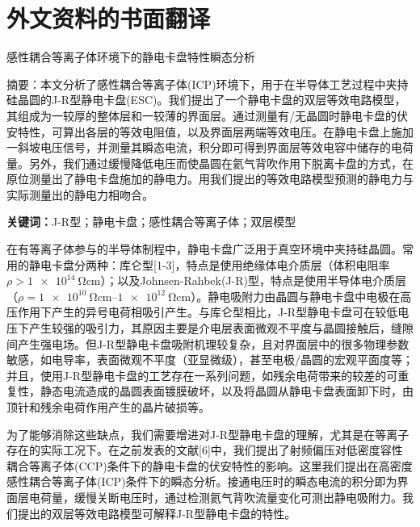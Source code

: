 \cleardoublepage

\newcommand{\apptitle}[1]{\parbox{0.9\linewidth}{\centering #1}\par\bigskip}
\newcommand{\appfigref}[2]{图~#1 -- #2~}
\newcommand{\appcite}[1]{\par\bigskip\apptitle{原文索引}\noindent\parbox{1\linewidth}{\small #1}}
\chapter{外文资料的书面翻译}

\apptitle{感性耦合等离子体环境下的静电卡盘特性瞬态分析}

\noindent 摘要：本文分析了感性耦合等离子体(ICP)环境下，用于在半导体工艺过程中夹持硅晶圆的J-R型静电卡盘(ESC)。我们提出了一个静电卡盘的双层等效电路模型，其组成为一较厚的整体层和一较薄的界面层。通过测量有/无晶圆时静电卡盘的伏安特性，可算出各层的等效电阻值，以及界面层两端等效电压。在静电卡盘上施加一斜坡电压信号，并测量其瞬态电流，积分即可得到界面层等效电容中储存的电荷量。另外，我们通过缓慢降低电压而使晶圆在氦气背吹作用下脱离卡盘的方式，在原位测量出了静电卡盘施加的静电力。用我们提出的等效电路模型预测的静电力与实际测量出的静电力相吻合。

\par\bigskip

\noindent \textbf{关键词：}J-R型；静电卡盘；感性耦合等离子体；双层模型

\par\bigskip

在有等离子体参与的半导体制程中，静电卡盘广泛用于真空环境中夹持硅晶圆。常用的静电卡盘分两种：库仑型[1-3]，特点是使用绝缘体电介质层（体积电阻率$\rho > \SI{1e14}{\ohm\cm}$）；以及Johnsen-Rahbek(J-R)型，特点是使用半导体电介质层（$\rho = \SIrange{1e10}{1e12}{\ohm\cm}$）。静电吸附力由晶圆与静电卡盘中电极在高压作用下产生的异号电荷相吸引产生。与库仑型相比，J-R型静电卡盘可在较低电压下产生较强的吸引力，其原因主要是介电层表面微观不平度与晶圆接触后，缝隙间产生强电场。但J-R型静电卡盘吸附机理较复杂，且对界面层中的很多物理参数敏感，如电导率，表面微观不平度（亚显微级），甚至电极/晶圆的宏观平面度等；并且，使用J-R型静电卡盘的工艺存在一系列问题，如残余电荷带来的较差的可重复性，静态电流造成的晶圆表面镀膜破坏，以及将晶圆从静电卡盘表面卸下时，由顶针和残余电荷作用产生的晶片破损等。

为了能够消除这些缺点，我们需要增进对J-R型静电卡盘的理解，尤其是在等离子存在的实际工况下。在之前发表的文献[6]中，我们提出了射频偏压对低密度容性耦合等离子体(CCP)条件下的静电卡盘的伏安特性的影响。这里我们提出在高密度感性耦合等离子体(ICP)条件下的瞬态分析。接通电压时的瞬态电流的积分即为界面层电荷量，缓慢关断电压时，通过检测氦气背吹流量变化可测出静电吸附力。我们提出的双层等效电路模型可解释J-R型静电卡盘的特性。

